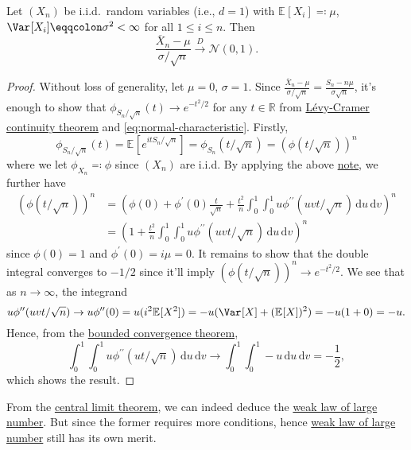 \begin{theorem}\label{thm:CLT}
	Let \((X_n)\) be i.i.d.\ random variables (i.e., \(d = 1\)) with \(\mathbb{E}_{}[X_i] \eqqcolon \mu \), \(\Var_{}[X_i] \eqqcolon \sigma ^2 < \infty \) for all \(1 \leq i \leq n\). Then
	\[
		\frac{\overline{X} _n - \mu }{\sigma / \sqrt{n} } \overset{D}{\to } \mathcal{N} (0, 1).
	\]
\end{theorem}
\begin{proof}
	Without loss of generality, let \(\mu = 0\), \(\sigma = 1\). Since \(\frac{\overline{X} _n - \mu }{\sigma / \sqrt{n} } = \frac{S_n - n \mu }{\sigma \sqrt{n} }\), it's enough to show that \(\phi _{S_n / \sqrt{n} }(t) \to e^{-t^2 / 2}\) for any \(t \in \mathbb{R} \) from \hyperref[thm:Levy-Cramer-continuity]{Lévy-Cramer continuity theorem} and \autoref{eq:normal-characteristic}. Firstly,
	\[
		\phi _{S_n / \sqrt{n} } (t)
		= \mathbb{E}_{}[e^{i t S_n / \sqrt{n} }]
		= \phi _{S_n} (t / \sqrt{n} )
		= \left( \phi (t / \sqrt{n} ) \right) ^n
	\]
	where we let \(\phi _{X_n} \eqqcolon \phi \) since \((X_n)\) are i.i.d. By applying the above \hyperref[note:lec10]{note}, we further have
	\[
		\begin{split}
			\left( \phi (t / \sqrt{n} ) \right) ^n
			 & = \left( \phi (0) + \phi ^{\prime} (0) \frac{t}{\sqrt{n} } + \frac{t^2}{n} \int_{0}^{1} \int_{0}^{1} u \phi ^{\prime\prime} (u v t / \sqrt{n} ) \,\mathrm{d}u  \,\mathrm{d}v  \right) ^n \\
			 & = \left( 1 + \frac{t^2}{n}\int_{0}^{1} \int_{0}^{1} u \phi ^{\prime\prime} (u v t / \sqrt{n} ) \,\mathrm{d}u  \,\mathrm{d}v \right) ^n
		\end{split}
	\]
	since \(\phi (0) = 1\) and \(\phi ^{\prime} (0) = i \mu = 0\). It remains to show that the double integral converges to \(- 1 / 2\) since it'll imply \((\phi (t / \sqrt{n} ))^n \to e^{-t^2 / 2}\). We see that as \(n \to \infty \), the integrand
	\[
		u \phi ^{\prime\prime} (u v t / \sqrt{n} )
		\to u \phi ^{\prime\prime} (0)
		= u (i^2 \mathbb{E}_{}[X^2])
		= - u (\Var_{}[X] + (\mathbb{E}_{}[X] )^2 )
		= - u (1 + 0)
		= -u.
	\]
	Hence, from the \href{https://en.wikipedia.org/wiki/Dominated_convergence_theorem}{bounded convergence theorem},
	\[
		\int_{0}^{1} \int_{0}^{1} u \phi ^{\prime\prime} (u t / \sqrt{n} ) \,\mathrm{d}u \,\mathrm{d}v
		\to \int_{0}^{1} \int_{0}^{1} -u \,\mathrm{d}u \,\mathrm{d}v
		= -\frac{1}{2},
	\]
	which shows the result.
\end{proof}

\begin{remark}
	From the \hyperref[thm:CLT]{central limit theorem}, we can indeed deduce the \hyperref[thm:WLLN]{weak law of large number}. But since the former requires more conditions, hence \hyperref[thm:WLLN]{weak law of large number} still has its own merit.
\end{remark}

